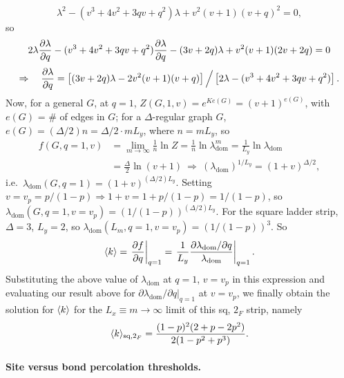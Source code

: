 \begin{equation}
  \lambda^2 - (v^3+4v^2+3qv+q^2)\lambda + v^2(v+1)(v+q)^2 = 0,
\end{equation}
so
\begin{equation}
  2\lambda\frac{\partial \lambda}{\partial q} - (v^3+4v^2+3qv+q^2)\frac{\partial \lambda}{\partial q} - (3v+2q)\lambda + v^2(v+1)(2v+2q) = 0
\end{equation}
\begin{equation}
  \Rightarrow\quad\frac{\partial \lambda}{\partial q} = \left[(3v+2q)\lambda - 2v^2(v+1)(v+q)\right]\Big/\left[2\lambda - (v^3+4v^2+3qv+q^2)\right].
\end{equation}
Now, for a general $G$, at $q = 1$, $Z(G,1,v) = e^{Ke(G)} = (v+1)^{e(G)}$, with $e(G)$ = \# of edges in $G$; for a
$\Delta$-regular graph $G$, $e(G) = (\Delta/2)n = \Delta/2\cdot mL_y$, where $n = mL_y$, so
\begin{align}
  f(G,q=1,v) &= \lim_{m\to\infty}\frac{1}{n}\ln Z = \frac{1}{n}\ln\lambda_{\text{dom}}^m = \frac{1}{L_y}\ln\lambda_{\text{dom}}\nonumber\\
  &= \frac{\Delta}{2}\ln(v+1)\ \Rightarrow\ (\lambda_{\text{dom}})^{1/L_y} = (1+v)^{\Delta/2},
\end{align}
i.e.\ $\lambda_{\text{dom}}(G,q=1) = (1+v)^{(\Delta/2)L_y}$. Setting $v = v_p = p/(1-p)\Rightarrow
1+v = 1+p/(1-p) = 1/(1-p)$, so $\lambda_{\text{dom}}(G,q=1,v=v_p) = \left(1/(1-p)\right)^{(\Delta/2)L_y}$. For the
square ladder strip, $\Delta = 3$, $L_y = 2$, so $\lambda_{\text{dom}}(L_m,q=1,v=v_p) = \left(1/(1-p)\right)^3$. So
\begin{equation}
  \langle k\rangle = \left.\frac{\partial f}{\partial q}\right|_{q=1} = \left.\frac{1}{L_y}\frac{\partial\lambda_{\text{dom}}/\partial q}{\lambda_{\text{dom}}}\right|_{q=1}.
\end{equation}
Substituting the above value of $\lambda_{\text{dom}}$ at $q = 1$, $v = v_p$ in this expression and evaluating our result
above for $\left.\partial\lambda_{\text{dom}}/\partial q\right|_{q=1}$ at $v = v_p$, we finally obtain the solution for
$\langle k\rangle$ for the $L_x\equiv m\to\infty$ limit of this sq, $2_F$ strip, namely
\begin{equation}
  \langle k\rangle_{\text{sq},2_F} = \frac{(1-p)^2(2+p-2p^2)}{2(1-p^2+p^3)}.
\end{equation}

\paragraph{Site versus bond percolation thresholds.}

